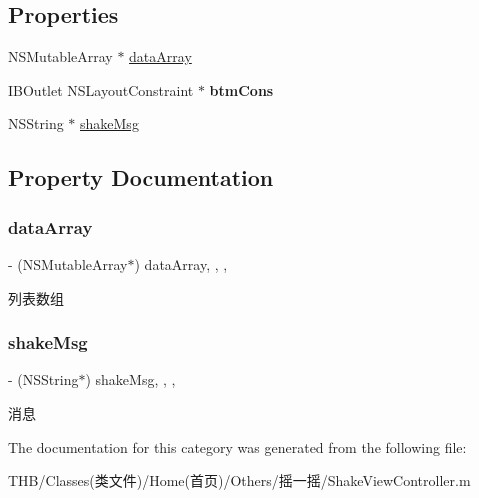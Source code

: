 \subsection*{Properties}
\begin{DoxyCompactItemize}
\item 
N\+S\+Mutable\+Array $\ast$ \mbox{\hyperlink{category_shake_view_controller_07_08_a294f910358092eac96ef3c1443a303de}{data\+Array}}
\item 
\mbox{\label{category_shake_view_controller_07_08_a13f3ea6c2fc4dcb73035eeb1d3fae306}} 
I\+B\+Outlet N\+S\+Layout\+Constraint $\ast$ {\bfseries btm\+Cons}
\item 
N\+S\+String $\ast$ \mbox{\hyperlink{category_shake_view_controller_07_08_aba248d59a2f5e540c5739912230d80f8}{shake\+Msg}}
\end{DoxyCompactItemize}


\subsection{Property Documentation}
\mbox{\label{category_shake_view_controller_07_08_a294f910358092eac96ef3c1443a303de}} 
\subsubsection{\texorpdfstring{data\+Array}{dataArray}}
{\footnotesize\ttfamily -\/ (N\+S\+Mutable\+Array$\ast$) data\+Array\hspace{0.3cm}{\ttfamily [read]}, {\ttfamily [write]}, {\ttfamily [nonatomic]}, {\ttfamily [strong]}}

列表数组 \mbox{\label{category_shake_view_controller_07_08_aba248d59a2f5e540c5739912230d80f8}} 
\subsubsection{\texorpdfstring{shake\+Msg}{shakeMsg}}
{\footnotesize\ttfamily -\/ (N\+S\+String$\ast$) shake\+Msg\hspace{0.3cm}{\ttfamily [read]}, {\ttfamily [write]}, {\ttfamily [nonatomic]}, {\ttfamily [strong]}}

消息 

The documentation for this category was generated from the following file\+:\begin{DoxyCompactItemize}
\item 
T\+H\+B/\+Classes(类文件)/\+Home(首页)/\+Others/摇一摇/Shake\+View\+Controller.\+m\end{DoxyCompactItemize}

